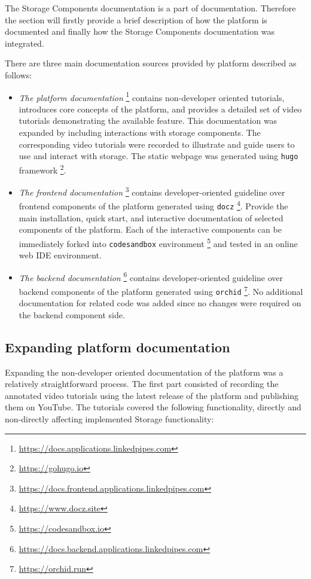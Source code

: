 The Storage Components documentation is a part of \lpa{} documentation. Therefore the section will firstly provide a brief description of how the \lpa{} platform is documented and finally how the Storage Components documentation was integrated.

There are three main documentation sources provided by \lpa{} platform described as follows:
\begin{itemize}
    \item \textit{The platform documentation} \footnote{\url{https://docs.applications.linkedpipes.com}} contains non-developer oriented tutorials, introduces core concepts of the platform, and provides a detailed set of video tutorials demonstrating the available feature. This documentation was expanded by including interactions with storage components. The corresponding video tutorials were recorded to illustrate and guide users to use and interact with storage. The static webpage was generated using \texttt{hugo} framework \footnote{\url{https://gohugo.io}}.
    \item \textit{The frontend documentation} \footnote{\url{https://docs.frontend.applications.linkedpipes.com}} contains developer-oriented guideline over frontend components of the platform generated using \texttt{docz} \footnote{\url{https://www.docz.site}}. Provide the main installation, quick start, and interactive documentation of selected components of the platform. Each of the interactive components can be immediately forked into \texttt{codesandbox} environment \footnote{\url{https://codesandbox.io}} and tested in an online web IDE environment. 
    \item \textit{The backend documentation} \footnote{\url{https://docs.backend.applications.linkedpipes.com}} contains developer-oriented guideline over backend components of the platform generated using \texttt{orchid} \footnote{\url{https://orchid.run}}. No additional documentation for \lpas{} related code was added since no changes were required on the backend component side.
\end{itemize}

\subsection{Expanding platform documentation}

Expanding the non-developer oriented documentation of the \lpa{} platform was a relatively straightforward process. The first part consisted of recording the annotated video tutorials using the latest release of the platform and publishing them on \lpa{} YouTube. The tutorials covered the following functionality, directly and non-directly affecting implemented Storage functionality:

